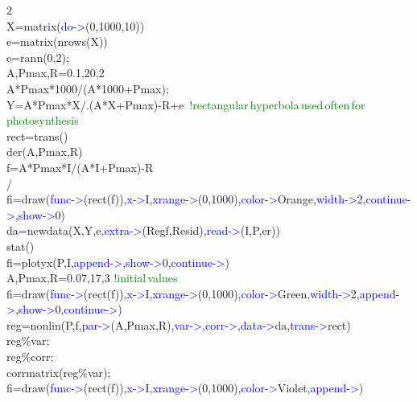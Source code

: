 \begin{example}[derex2]2\\
\label{derex2}
X=\textcolor{VioletRed}{matrix}(\textcolor{blue}{do->}(0,1000,10))\\
e=\textcolor{VioletRed}{matrix}(\textcolor{VioletRed}{nrows}(X))\\
e=\textcolor{VioletRed}{rann}(0,2);\\
A,Pmax,R=0.1,20,2\\
A*Pmax*1000/(A*1000+Pmax);\\
Y=A*Pmax*X/.(A*X+Pmax)-R+e \,\textcolor{green}{!rectangular\,hyperbola\,used\,often\,for\,photosynthesis}\\
rect=\textcolor{VioletRed}{trans}()\\
\textcolor{VioletRed}{der}(A,Pmax,R)\\
f=A*Pmax*I/(A*I+Pmax)-R\\
/\\
fi=\textcolor{VioletRed}{draw}(\textcolor{blue}{func->}(rect(f)),\textcolor{blue}{x->}I,\textcolor{blue}{xrange->}(0,1000),\textcolor{blue}{color->}Orange,\textcolor{blue}{width->}2,\textcolor{blue}{continue->},\textcolor{blue}{show->}0)\\
da=\textcolor{VioletRed}{newdata}(X,Y,e,\textcolor{blue}{extra->}(Regf,Resid),\textcolor{blue}{read->}(I,P,er))\\
\textcolor{VioletRed}{stat}()\\
fi=\textcolor{VioletRed}{plotyx}(P,I,\textcolor{blue}{append->},\textcolor{blue}{show->}0,\textcolor{blue}{continue->})\\
A,Pmax,R=0.07,17,3 \textcolor{green}{!initial\,values}\\
fi=\textcolor{VioletRed}{draw}(\textcolor{blue}{func->}(rect(f)),\textcolor{blue}{x->}I,\textcolor{blue}{xrange->}(0,1000),\textcolor{blue}{color->}Green,\textcolor{blue}{width->}2,\textcolor{blue}{append->},\textcolor{blue}{show->}0,\textcolor{blue}{continue->})\\
reg=\textcolor{VioletRed}{nonlin}(P,f,\textcolor{blue}{par->}(A,Pmax,R),\textcolor{blue}{var->},\textcolor{blue}{corr->},\textcolor{blue}{data->}da,\textcolor{blue}{trans->}rect)\\
reg\%var;\\
reg\%corr;\\
\textcolor{VioletRed}{corrmatrix}(reg\%var);\\
fi=\textcolor{VioletRed}{draw}(\textcolor{blue}{func->}(rect(f)),\textcolor{blue}{x->}I,\textcolor{blue}{xrange->}(0,1000),\textcolor{blue}{color->}Violet,\textcolor{blue}{append->})
\end{example}
